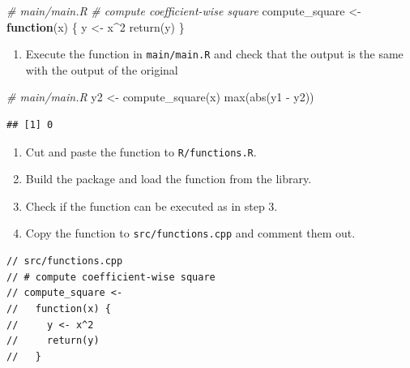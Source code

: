 \documentclass[
]{book}
\newenvironment{Shaded}{\begin{snugshade}}{\end{snugshade}}
\newcommand{\CommentTok}[1]{\textcolor[rgb]{0.56,0.35,0.01}{\textit{#1}}}
\newcommand{\ControlFlowTok}[1]{\textcolor[rgb]{0.13,0.29,0.53}{\textbf{#1}}}
\newcommand{\DecValTok}[1]{\textcolor[rgb]{0.00,0.00,0.81}{#1}}
\newcommand{\FunctionTok}[1]{\textcolor[rgb]{0.00,0.00,0.00}{#1}}
\newcommand{\NormalTok}[1]{#1}
\newcommand{\OtherTok}[1]{\textcolor[rgb]{0.56,0.35,0.01}{#1}}
\newcommand{\SpecialCharTok}[1]{\textcolor[rgb]{0.00,0.00,0.00}{#1}}
\providecommand{\tightlist}{%
  \setlength{\itemsep}{0pt}\setlength{\parskip}{0pt}}
\begin{document}
\begin{Shaded}
\begin{Highlighting}[]
\CommentTok{\# main/main.R}
\CommentTok{\# compute coefficient{-}wise square}
\NormalTok{compute\_square }\OtherTok{\textless{}{-}}
  \ControlFlowTok{function}\NormalTok{(x) \{}
\NormalTok{    y }\OtherTok{\textless{}{-}}\NormalTok{ x}\SpecialCharTok{\^{}}\DecValTok{2}
    \FunctionTok{return}\NormalTok{(y)}
\NormalTok{  \}}
\end{Highlighting}
\end{Shaded}

\begin{enumerate}
\def\labelenumi{\arabic{enumi}.}
\setcounter{enumi}{2}
\tightlist
\item
  Execute the function in \texttt{main/main.R} and check that the output is the same with the output of the original
\end{enumerate}

\begin{Shaded}
\begin{Highlighting}[]
\CommentTok{\# main/main.R}
\NormalTok{y2 }\OtherTok{\textless{}{-}} \FunctionTok{compute\_square}\NormalTok{(x)}
\FunctionTok{max}\NormalTok{(}\FunctionTok{abs}\NormalTok{(y1 }\SpecialCharTok{{-}}\NormalTok{ y2))}
\end{Highlighting}
\end{Shaded}

\begin{verbatim}
## [1] 0
\end{verbatim}

\begin{enumerate}
\def\labelenumi{\arabic{enumi}.}
\setcounter{enumi}{3}
\tightlist
\item
  Cut and paste the function to \texttt{R/functions.R}.
\item
  Build the package and load the function from the library.
\item
  Check if the function can be executed as in step 3.
\item
  Copy the function to \texttt{src/functions.cpp} and comment them out.
\end{enumerate}

\begin{verbatim}
// src/functions.cpp
// # compute coefficient-wise square
// compute_square <-
//   function(x) {
//     y <- x^2
//     return(y)
//   }
\end{verbatim}
\end{document}
